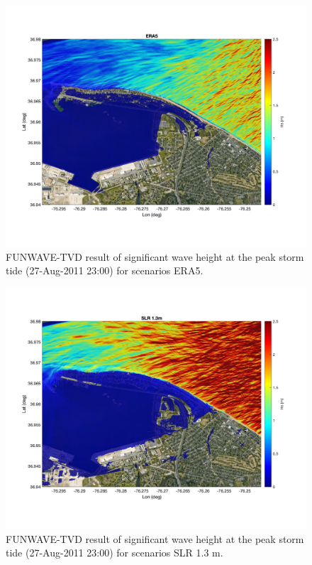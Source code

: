 \documentclass[preprint,12pt,authoryear] {elsarticle}
\begin{document}
\begin{figure}
\centering
\includegraphics[width=\textwidth]{./figures/funwave_ERA5_hs.jpg}
\caption{FUNWAVE-TVD result of significant wave height at the peak storm tide (27-Aug-2011 23:00) for scenarios ERA5.  }
\label{funwave_ERA5_hs}
\centering
\end{figure}

\begin{figure}
\centering
\includegraphics[width=\textwidth]{./figures/funwave_SLR_hs.jpg}
\caption{FUNWAVE-TVD result of significant wave height at the peak storm tide (27-Aug-2011 23:00) for scenarios SLR 1.3 m.  }
\label{funwave_SLR_hs }
\centering
\end{figure}
\end{document}
